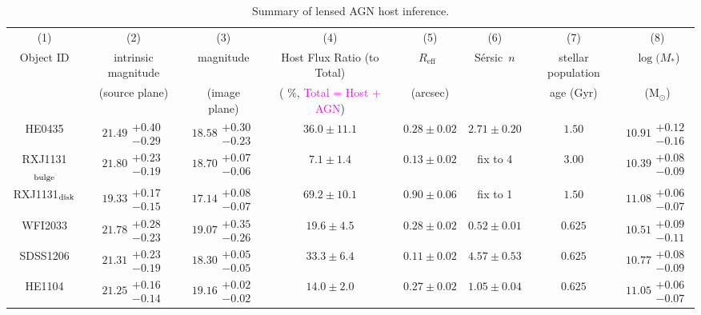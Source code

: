 \documentclass[fleqn,usenatbib]{mnras}
\newcommand{\sersic}{S\'ersic}
\newcommand{\reff}{{$R_{\mathrm{eff}}$}}
\newcommand{\pink}[1]{{\textcolor{magenta}{#1}}}
\begin{document}
\begin{table}
\renewcommand{\arraystretch}{1.25}
\centering
  \begin{threeparttable}
\caption{Summary of lensed AGN host inference.}\label{tab:host_measure}    
     \begin{tabular}{cccccccc}
\hline     
(1) & (2) & (3) & (4) & (5) & (6) & (7) & (8) \\    
Object ID & intrinsic magnitude & magnitude & Host Flux Ratio (to Total) & \reff\ & \sersic\ $n$ & stellar population & $\log (M_{*}$)  \\
 & (source plane) & (image plane) & ( $\%$, \pink{Total = Host + AGN}) & (arcsec) & & age (Gyr) & (M$_{\odot}$) \\ \hline
HE0435 & $21.49\substack{+0.40\\-0.29}$ & $18.58\substack{+0.30\\-0.23}$ & $36.0\pm11.1$ & $0.28\pm0.02$ & $2.71\pm0.20$ & $1.50$ & $10.91\substack{+0.12\\-0.16}$ \\
RXJ1131$_{\rm bulge}$ & $21.80\substack{+0.23\\-0.19}$ & $18.70\substack{+0.07\\-0.06}$ & $7.1\pm1.4$ & $0.13\pm0.02$ & fix to 4 & $3.00$ & $10.39\substack{+0.08\\-0.09}$ \\
RXJ1131$_{\rm disk}$ & $19.33\substack{+0.17\\-0.15}$ & $17.14\substack{+0.08\\-0.07}$ & $69.2\pm10.1$ & $0.90\pm0.06$ & fix to 1 & $1.50$ & $11.08\substack{+0.06\\-0.07}$ \\
WFI2033 & $21.78\substack{+0.28\\-0.23}$ & $19.07\substack{+0.35\\-0.26}$ & $19.6\pm4.5$ & $0.28\pm0.02$ & $0.52\pm0.01$ & $0.625$ & $10.51\substack{+0.09\\-0.11}$ \\
SDSS1206 & $21.31\substack{+0.23\\-0.19}$ & $18.30\substack{+0.05\\-0.05}$ & $33.3\pm6.4$ & $0.11\pm0.02$ & $4.57\pm0.53$ & $0.625$ & $10.77\substack{+0.08\\-0.09}$ \\
HE1104 & $21.25\substack{+0.16\\-0.14}$ & $19.16\substack{+0.02\\-0.02}$ & $14.0\pm2.0$ & $0.27\pm0.02$ & $1.05\pm0.04$ & $0.625$ & $11.05\substack{+0.06\\-0.07}$ \\

\end{tabular}
\end{threeparttable}
\end{table}
\end{document}
